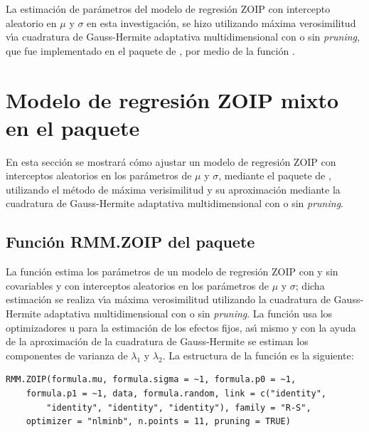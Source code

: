 La estimaci\'{o}n de pa\-r\'{a}\-me\-tros del modelo de regresi\'{o}n ZOIP con intercepto aleatorio en $\mu$ y $\sigma$ en esta investigaci\'{o}n, se hizo utilizando m\'{a}xima verosimilitud v\'{\i}a cuadratura de Gauss-Hermite adaptativa multidimensional con o sin \textit{pruning}, que fue implementado en el paquete  de , por medio de la funci\'{o}n .


\section{Modelo de regresi\'{o}n ZOIP mixto en el paquete }

En esta secci\'{o}n se mostrar\'{a} c\'{o}mo ajustar un modelo de regresi\'{o}n ZOIP con interceptos aleatorios en los par\'{a}metros de $\mu$ y $\sigma$, mediante el paquete  de , utilizando el m\'{e}todo de m\'{a}xima verisimilitud y su aproximaci\'{o}n mediante la cuadratura de Gauss-Hermite adaptativa multidimensional con o sin \textit{pruning}.

\subsection*{Funci\'{o}n RMM.ZOIP del paquete } 

La funci\'{o}n  estima los par\'{a}metros de un modelo de regresi\'{o}n ZOIP con y sin covariables y con interceptos aleatorios en los par\'{a}metros de $\mu$ y $\sigma$; dicha estimaci\'{o}n se realiza v\'{\i}a m\'{a}xima verosimilitud utilizando la cuadratura de Gauss-Hermite adaptativa multidimensional con o sin \textit{pruning}. La funci\'{o}n  usa los optimizadores  u  para la estimaci\'{o}n de los efectos fijos, as\'{\i} mismo y con la ayuda de la aproximaci\'{o}n de la cuadratura de Gauss-Hermite se estiman los componentes de varianza de $\lambda_1$ y $\lambda_2$. La estructura de la funci\'{o}n  es la siguiente:

\begin{verbatim}
RMM.ZOIP(formula.mu, formula.sigma = ~1, formula.p0 = ~1, 
    formula.p1 = ~1, data, formula.random, link = c("identity", 
        "identity", "identity", "identity"), family = "R-S", 
    optimizer = "nlminb", n.points = 11, pruning = TRUE)
\end{verbatim}

